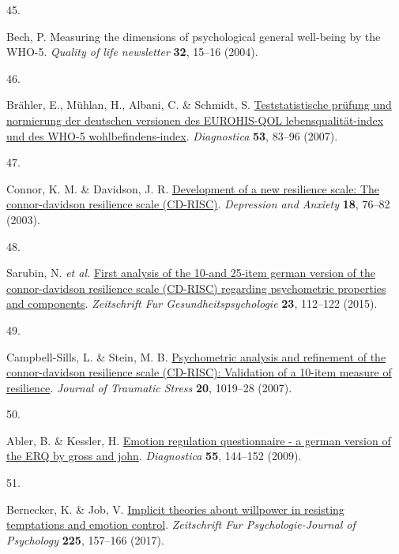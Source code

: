 \documentclass[
  man,floatsintext]{apa6}
\newlength{\cslhangindent}
\newlength{\csllabelwidth}
\newlength{\cslentryspacingunit} %
\newenvironment{CSLReferences}[2] %
 {%
  \setlength{\parindent}{0pt}
  \ifodd #1
  \let\oldpar\par
  \def\par{\hangindent=\cslhangindent\oldpar}
  \fi
  \setlength{\parskip}{#2\cslentryspacingunit}
 }%
 {}
\newcommand{\CSLLeftMargin}[1]{\parbox[t]{\csllabelwidth}{#1}}
\newcommand{\CSLRightInline}[1]{\parbox[t]{\linewidth - \csllabelwidth}{#1}\break}
\begin{document}
\begin{CSLReferences}{0}{0}
\leavevmode{}%
\CSLLeftMargin{45. }%
\CSLRightInline{Bech, P. Measuring the dimensions of psychological general well-being by the WHO-5. \emph{Quality of life newsletter} \textbf{32}, 15--16 (2004).}

\leavevmode{}%
\CSLLeftMargin{46. }%
\CSLRightInline{Brähler, E., Mühlan, H., Albani, C. \& Schmidt, S. \href{https://doi.org/10.1026/0012-1924.53.2.83}{Teststatistische pr{ü}fung und normierung der deutschen versionen des EUROHIS-QOL lebensqualit{ä}t-index und des WHO-5 wohlbefindens-index}. \emph{Diagnostica} \textbf{53}, 83--96 (2007).}

\leavevmode{}%
\CSLLeftMargin{47. }%
\CSLRightInline{Connor, K. M. \& Davidson, J. R. \href{https://doi.org/10.1002/da.10113}{Development of a new resilience scale: The connor-davidson resilience scale (CD-RISC)}. \emph{Depression and Anxiety} \textbf{18}, 76--82 (2003).}

\leavevmode{}%
\CSLLeftMargin{48. }%
\CSLRightInline{Sarubin, N. \emph{et al.} \href{https://doi.org/10.1026/0943-8149/a000142}{First analysis of the 10-and 25-item german version of the connor-davidson resilience scale (CD-RISC) regarding psychometric properties and components}. \emph{Zeitschrift Fur Gesundheitspsychologie} \textbf{23}, 112--122 (2015).}

\leavevmode{}%
\CSLLeftMargin{49. }%
\CSLRightInline{Campbell-Sills, L. \& Stein, M. B. \href{https://doi.org/10.1002/jts.20271}{Psychometric analysis and refinement of the connor-davidson resilience scale (CD-RISC): Validation of a 10-item measure of resilience}. \emph{Journal of Traumatic Stress} \textbf{20}, 1019--28 (2007).}

\leavevmode{}%
\CSLLeftMargin{50. }%
\CSLRightInline{Abler, B. \& Kessler, H. \href{https://doi.org/10.1026/0012-1924.55.3.144}{Emotion regulation questionnaire - a german version of the ERQ by gross and john}. \emph{Diagnostica} \textbf{55}, 144--152 (2009).}

\leavevmode{}%
\CSLLeftMargin{51. }%
\CSLRightInline{Bernecker, K. \& Job, V. \href{https://doi.org/10.1027/2151-2604/a000292}{Implicit theories about willpower in resisting temptations and emotion control}. \emph{Zeitschrift Fur Psychologie-Journal of Psychology} \textbf{225}, 157--166 (2017).}


\end{CSLReferences}
\end{document}
